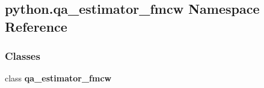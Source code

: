 \subsection{python.\+qa\+\_\+estimator\+\_\+fmcw Namespace Reference}
\label{namespacepython_1_1qa__estimator__fmcw}
\subsubsection*{Classes}
\begin{DoxyCompactItemize}
\item 
class {\bf qa\+\_\+estimator\+\_\+fmcw}
\end{DoxyCompactItemize}
